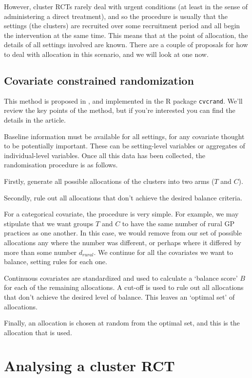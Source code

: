 \documentclass[
  openany]{book}
\theoremstyle{definition}
\theoremstyle{definition}
\theoremstyle{definition}
\theoremstyle{definition}
\theoremstyle{remark}
\begin{document}
However, cluster RCTs rarely deal with urgent conditions (at least in the sense of administering a direct treatment), and so the procedure is usually that the settings (the clusters) are recruited over some recruitment period and all begin the intervention at the same time. This means that at the point of allocation, the details of all settings involved are known.
There are a couple of proposals for how to deal with allocation in this scenario, and we will look at one now.

\subsection{Covariate constrained randomization}\label{covariate-constrained-randomization}

This method is proposed in \citet{dickinson2015pragmatic}, and implemented in the R package \texttt{cvcrand}. We'll review the key points of the method, but if you're interested you can find the details in the article.

Baseline information must be available for all settings, for any covariate thought to be potentially important. These can be setting-level variables or aggregates of individual-level variables. Once all this data has been collected, the randomisation procedure is as follows.

Firstly, generate all possible allocations of the clusters into two arms (\(T\) and \(C\)).

Secondly, rule out all allocations that don't achieve the desired balance criteria.

For a categorical covariate, the procedure is very simple. For example, we may stipulate that we want groups \(T\) and \(C\) to have the same number of rural GP practices as one another. In this case, we would remove from our set of possible allocations any where the number was different, or perhaps where it differed by more than some number \(d_{rural}\). We continue for all the covariates we want to balance, setting rules for each one.

Continuous covariates are standardized and used to calculate a `balance score' \(B\) for each of the remaining allocations. A cut-off is used to rule out all allocations that don't achieve the desired level of balance. This leaves an `optimal set' of allocations.

Finally, an allocation is chosen at random from the optimal set, and this is the allocation that is used.

\section{Analysing a cluster RCT}\label{analysing-a-cluster-rct}
\end{document}
